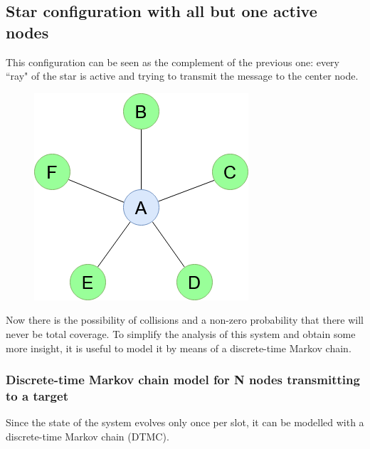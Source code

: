 \subsection{Star configuration with all but one active nodes}
\label{ssec:star2}
This configuration can be seen as the complement of the previous one: every ``ray" of the star is active and trying to transmit the message to the center node.
\begin{figure}[H]%
    \centering
	{{\includegraphics[scale=0.5]{img/star_graph2.png} }}%
    \caption{}%
    \label{fig:star_graph_2}%
\end{figure}
Now there is the possibility of collisions and a non-zero probability that there will never be total coverage.
To simplify the analysis of this system and obtain some more insight, it is useful to model it by means of a discrete-time Markov chain.
\subsubsection{Discrete-time Markov chain model for N nodes transmitting to a target}
Since the state of the system evolves only once per slot, it can be modelled with a discrete-time Markov chain (DTMC).
\hfill \break
\hfill \break

